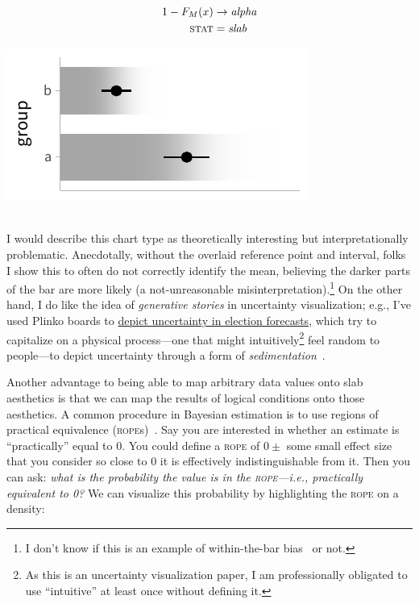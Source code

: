 \documentclass[journal]{vgtc}                     %
\newcommand{\equationfigure}[2]{%
\noindent
\begin{minipage}{.5\columnwidth}
\setlength{\abovedisplayskip}{0pt}
\setlength{\belowdisplayskip}{0pt}
#1\end{minipage}%
\begin{minipage}{.4\columnwidth}\centering #2 \end{minipage}%
\vspace{.5\belowdisplayskip}\\
}
\begin{document}
\equationfigure{
\begin{align*}
1 - F_M(x) &\rightarrow \textit{alpha}\\
\textsc{stat} &= \mathit{slab}
\end{align*}
}{\includegraphics[width=1.2\columnwidth]{figs/3-slab_fuzzygram.pdf}}
I would describe this chart type as theoretically interesting but interpretationally problematic. Anecdotally, without the overlaid reference point and interval, folks I show this to often do not correctly identify the mean, believing the darker parts of the bar are more likely (a not-unreasonable misinterpretation).\footnote{I don't know if this is an example of within-the-bar bias~\cite{newman2012bar} or not.} On the other hand, I do like the idea of \textit{generative stories} in uncertainty visualization; e.g., I've used Plinko boards to \href{https://presidential-plinko.com/}{depict uncertainty in election forecasts}, which try to capitalize on a physical process---one that might intuitively\footnote{As this is an uncertainty visualization paper, I am professionally obligated to use ``intuitive'' at least once without defining it.} feel random to people---to depict uncertainty through a form of \textit{sedimentation}~\cite{huron2013sediment}.

Another advantage to being able to map arbitrary data values onto slab aesthetics is that we can map the results of logical conditions onto those aesthetics. A common procedure in Bayesian estimation is to use regions of practical equivalence (\textsc{rope}s)~\cite{kruschke2018rejecting}. Say you are interested in whether an estimate is ``practically'' equal to 0. You could define a \textsc{rope} of $0\pm$ some small effect size that you consider so close to 0 it is effectively indistinguishable from it. Then you can ask: \textit{what is the probability the value is in the \textsc{rope}---i.e., practically equivalent to 0?} We can visualize this probability by highlighting the \textsc{rope} on a density:
\end{document}
